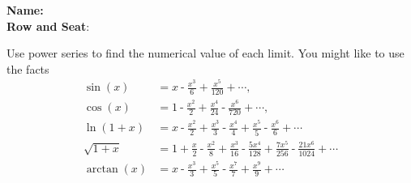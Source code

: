 \documentclass[fleqn,12pt]{exam}
\begin{document}
\large
\vspace{0.1in}
\noindent{}
\textbf{Name:} \hrulefill \\
\noindent {}
\textbf{Row and Seat}:\hrulefill\\
\vspace{0.1in}



\vspace{0.1in}



\begin{questions}
\question Use power series to find the numerical value of each limit. You might like to use the facts
\begin{align*}
\sin(x) &=  x\operatorname{-}\frac{{{x}^{3}}}{6}\operatorname{+}\frac{{{x}^{5}}}{120}\operatorname{+} \cdots, \\
\cos(x) &=  1\operatorname{-}\frac{{{x}^{2}}}{2}\operatorname{+}\frac{{{x}^{4}}}{24}\operatorname{-}\frac{{{x}^{6}}}{720}\operatorname{+} \cdots, \\
\ln(1+x) &= 
 x\operatorname{-}\frac{{{x}^{2}}}{2}\operatorname{+}\frac{{{x}^{3}}}{3}\operatorname{-}\frac{{{x}^{4}}}{4}\operatorname{+}\frac{{{x}^{5}}}{5}\operatorname{-}\frac{{{x}^{6}}}{6}\operatorname{+} \cdots \\
\sqrt{1+x} &= 1\operatorname{+}\frac{x}{2}\operatorname{-}\frac{{{x}^{2}}}{8}\operatorname{+}\frac{{{x}^{3}}}{16}\operatorname{-}\frac{5 {{x}^{4}}}{128}\operatorname{+}\frac{7 {{x}^{5}}}{256}\operatorname{-}\frac{21 {{x}^{6}}}{1024}\operatorname{+}\cdots \\
\arctan(x) &= x\operatorname{-}\frac{{{x}^{3}}}{3}\operatorname{+}\frac{{{x}^{5}}}{5}\operatorname{-}\frac{{{x}^{7}}}{7}\operatorname{+}\frac{{{x}^{9}}}{9}\operatorname{+} \cdots
\end{align*}

\end{questions}
\end{document}
